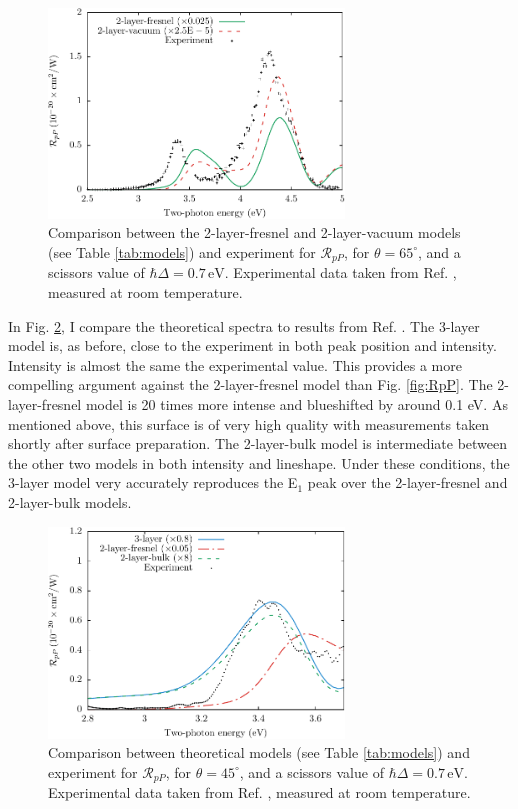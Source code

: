 \begin{figure}[H]
\centering 
\includegraphics[width=0.7\textwidth]
{content/figures/fig-Si1x1-Mejia_RpP_models}
\caption{Comparison between the 2-layer-fresnel and 2-layer-vacuum models (see
Table \ref{tab:models}) and experiment for $\mathcal{R}_{pP}$, for
$\theta=65^{\circ}$, and a scissors value of $\hbar\Delta = 0.7\,\text{eV}$.
Experimental data taken from Ref. \cite{mejiaPRB02}, measured at room
temperature.}
\label{fig:othermodels}
\end{figure}

In Fig. \ref{fig:mitchellRpP}, I compare the theoretical spectra to results from
Ref. \cite{mitchellSS01}. The 3-layer model is, as before, close to the
experiment in both peak position and intensity. Intensity is almost the same the
experimental value. This provides a more compelling argument against the
2-layer-fresnel model than Fig. \ref{fig:RpP}. The 2-layer-fresnel model is 20
times more intense and blueshifted by around 0.1 eV. As mentioned above, this
surface is of very high quality with measurements taken shortly after surface
preparation. The 2-layer-bulk model is intermediate between the other two models
in both intensity and lineshape. Under these conditions, the 3-layer model very
accurately reproduces the E$_{1}$ peak over the 2-layer-fresnel and 2-layer-bulk
models.

\begin{figure}[H]
\centering
\includegraphics[width=0.7\textwidth]{content/figures/fig-Si1x1-Mitchell_RpP}
\caption{Comparison between theoretical models (see Table \ref{tab:models}) and
experiment for $\mathcal{R}_{pP}$, for $\theta=45^{\circ}$, and a scissors value
of $\hbar\Delta = 0.7\,\text{eV}$. Experimental data taken from Ref.
\cite{mitchellSS01}, measured at room temperature.}
\label{fig:mitchellRpP}
\end{figure}


